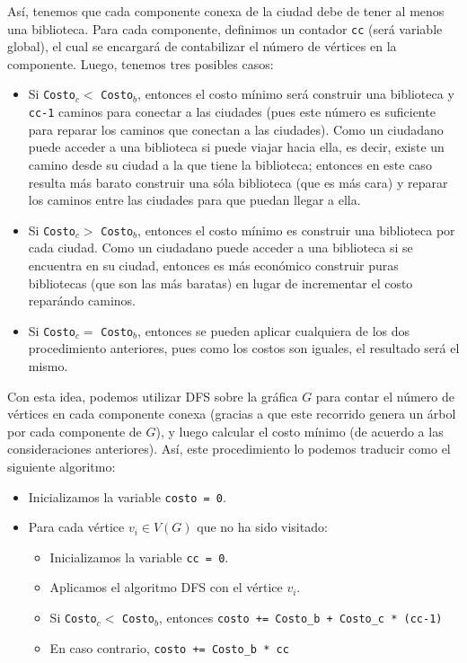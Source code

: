 \documentclass[letterpaper,11pt]{article}
\begin{document}
\begin{enumerate}
    Así, tenemos que cada componente conexa de la ciudad debe de tener al menos
    una biblioteca. Para cada componente, definimos un contador \texttt{cc} (será 
    variable global), el cual se encargará de contabilizar el número de vértices 
    en la componente. Luego, tenemos tres posibles casos:
    \begin{itemize}
        \item Si \texttt{Costo}$_c <$ \texttt{Costo}$_b$, entonces el costo 
        mínimo será construir una biblioteca y \texttt{cc-1} caminos para 
        conectar a las ciudades (pues este número es suficiente para reparar 
        los caminos que conectan a las ciudades). Como un ciudadano puede acceder 
        a una biblioteca si puede viajar hacia ella, es decir, existe un camino 
        desde su ciudad a la que tiene la biblioteca; entonces en este caso 
        resulta más barato construir una sóla biblioteca (que es más cara) y 
        reparar los caminos entre las ciudades para que puedan llegar a ella.

        \item Si \texttt{Costo}$_c >$ \texttt{Costo}$_b$, entonces el costo 
        mínimo es construir una biblioteca por cada ciudad. Como un ciudadano 
        puede acceder a una biblioteca si se encuentra en su ciudad, entonces 
        es más económico construir puras bibliotecas (que son las más baratas)
        en lugar de incrementar el costo reparándo caminos.

        \item Si \texttt{Costo}$_c =$ \texttt{Costo}$_b$, entonces se pueden 
        aplicar cualquiera de los dos procedimiento anteriores, pues como los 
        costos son iguales, el resultado será el mismo.
    \end{itemize}

    Con esta idea, podemos utilizar DFS sobre la gráfica $G$ para contar el 
    número de vértices en cada componente conexa (gracias a que este recorrido 
    genera un árbol por cada componente de $G$), y luego calcular el costo 
    mínimo (de acuerdo a las consideraciones anteriores). Así, este procedimiento 
    lo podemos traducir como el siguiente algoritmo:
    \begin{itemize}
        \item Inicializamos la variable \texttt{costo = 0}.
        \item Para cada vértice $v_i \in V(G)$ que no ha sido visitado:
        \begin{itemize}
            \item Inicializamos la variable \texttt{cc = 0}.
            \item Aplicamos el algoritmo DFS con el vértice $v_i$.
            \item Si \texttt{Costo}$_c <$ \texttt{Costo}$_b$, entonces 
            \texttt{costo += Costo\_b + Costo\_c * (cc-1)}
            \item En caso contrario, \texttt{costo += Costo\_b * cc}
        \end{itemize}


\end{itemize}
\end{enumerate}
\end{document}
